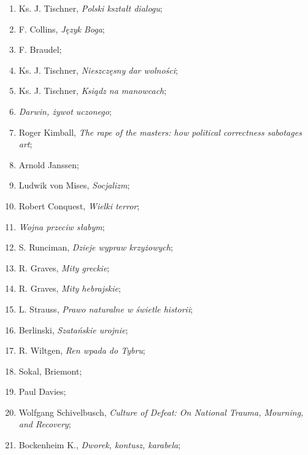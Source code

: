 \documentclass[a4paper,11pt]{article}
\begin{document}
\begin{enumerate}
\item Ks. J. Tischner, \emph{Polski kształt dialogu};

\item F. Collins, \emph{Język Boga};

\item F. Braudel;

\item Ks. J. Tischner, \emph{Nieszczęsny dar wolności};

\item Ks. J. Tischner, \emph{Ksiądz na manowcach};

\item \emph{Darwin, żywot uczonego};

\item Roger Kimball, \emph{The rape of the masters: how political
    correctness sabotages art};

\item Arnold Janssen;

\item Ludwik von Mises, \emph{Socjalizm};

\item Robert Conquest, \emph{Wielki terror};

\item \emph{Wojna przeciw słabym};

\item S. Runciman, \emph{Dzieje wypraw krzyżowych};

\item R. Graves, \emph{Mity greckie};

\item R. Graves, \emph{Mity hebrajskie};

\item L. Strauss, \emph{Prawo naturalne w świetle historii};

\item Berlinski, \emph{Szatańskie urojnie};

\item R. Wiltgen, \emph{Ren wpada do Tybru};

\item Sokal, Briemont;

\item Paul Davies;

\item Wolfgang Schivelbusch, \emph{Culture of Defeat: On National
    Trauma, Mourning, and Recovery};

\item Bockenheim K., \emph{Dworek, kontusz, karabela};


\end{enumerate}
\end{document}
